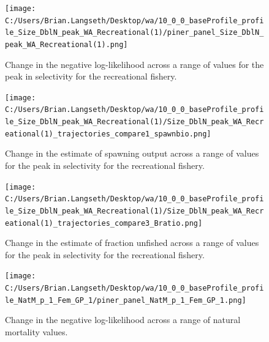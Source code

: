 \documentclass[11pt,
  english,
  letterpaper,
]{article}
\begin{document}
\begin{figure}
\centering
\texttt{[image: C:/Users/Brian.Langseth/Desktop/wa/10\_0\_0\_baseProfile\_profile\_Size\_DblN\_peak\_WA\_Recreational(1)/piner\_panel\_Size\_DblN\_peak\_WA\_Recreational(1).png]}
\caption{Change in the negative log-likelihood across a range of values for the peak in selectivity for the recreational fishery.\label{fig:recselex-profile}}
\end{figure}

\tagmcend\tagstructend


\begin{figure}
\centering
\texttt{[image: C:/Users/Brian.Langseth/Desktop/wa/10\_0\_0\_baseProfile\_profile\_Size\_DblN\_peak\_WA\_Recreational(1)/Size\_DblN\_peak\_WA\_Recreational(1)\_trajectories\_compare1\_spawnbio.png]}
\caption{Change in the estimate of spawning output across a range of values for the peak in selectivity for the recreational fishery.\label{fig:recselex-ssb}}
\end{figure}

\tagmcend\tagstructend


\begin{figure}
\centering
\texttt{[image: C:/Users/Brian.Langseth/Desktop/wa/10\_0\_0\_baseProfile\_profile\_Size\_DblN\_peak\_WA\_Recreational(1)/Size\_DblN\_peak\_WA\_Recreational(1)\_trajectories\_compare3\_Bratio.png]}
\caption{Change in the estimate of fraction unfished across a range of values for the peak in selectivity for the recreational fishery.\label{fig:recselex-depl}}
\end{figure}

\tagmcend\tagstructend


\begin{figure}
\centering
\texttt{[image: C:/Users/Brian.Langseth/Desktop/wa/10\_0\_0\_baseProfile\_profile\_NatM\_p\_1\_Fem\_GP\_1/piner\_panel\_NatM\_p\_1\_Fem\_GP\_1.png]}
\caption{Change in the negative log-likelihood across a range of natural mortality values.\label{fig:m-profile}}
\end{figure}
\end{document}
